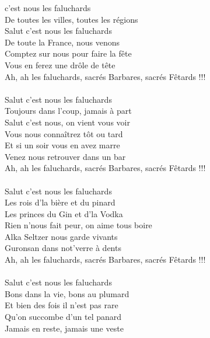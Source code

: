 
 c'est nous les faluchards
\\De toutes les villes, toutes les régions
\\Salut c'est nous les faluchards
\\De toute la France, nous venons
\\Comptez sur nous pour faire la fête
\\Vous en ferez une drôle de tête
\\Ah, ah les faluchards, sacrés Barbares, sacrés Fêtards !!!
\\\\Salut c'est nous les faluchards
\\Toujours dans l'coup, jamais à part
\\Salut c'est nous, on vient vous voir
\\Vous nous connaîtrez tôt ou tard
\\Et si un soir vous en avez marre
\\Venez nous retrouver dans un bar
\\Ah, ah les faluchards, sacrés Barbares, sacrés Fêtards !!!
\\\\Salut c'est nous les faluchards
\\Les rois d'la bière et du pinard
\\Les princes du Gin et d'la Vodka
\\Rien n'nous fait peur, on aime tous boire
\\Alka Seltzer nous garde vivants
\\Guronsan dans not'verre à dents
\\Ah, ah les faluchards, sacrés Barbares, sacrés Fêtards !!!
\\\\Salut c'est nous les faluchards
\\Bons dans la vie, bons au plumard
\\Et bien des fois il n'est pas rare
\\Qu'on succombe d'un tel panard
\\Jamais en reste, jamais une veste
